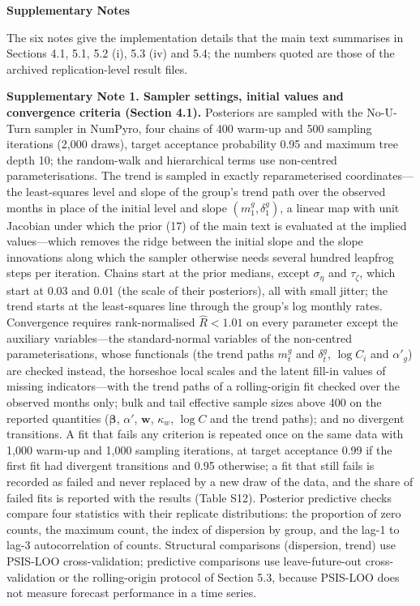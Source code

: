 \clearpage
{\large\bfseries Supplementary Notes}

The six notes give the implementation details that the main text summarises in Sections 4.1, 5.1, 5.2 (i), 5.3 (iv) and 5.4; the numbers quoted are those of the archived replication-level result files.

\textbf{Supplementary Note 1. Sampler settings, initial values and convergence criteria (Section 4.1).}
Posteriors are sampled with the No-U-Turn sampler in NumPyro, four chains of 400 warm-up and 500 sampling iterations (2,000 draws), target acceptance probability 0.95 and maximum tree depth 10; the random-walk and hierarchical terms use non-centred parameterisations. The trend is sampled in exactly reparameterised coordinates---the least-squares level and slope of the group's trend path over the observed months in place of the initial level and slope $(m_1^g, \delta_1^g)$, a linear map with unit Jacobian under which the prior (17) of the main text is evaluated at the implied values---which removes the ridge between the initial slope and the slope innovations along which the sampler otherwise needs several hundred leapfrog steps per iteration. Chains start at the prior medians, except $\sigma_\eta$ and $\tau_\zeta$, which start at 0.03 and 0.01 (the scale of their posteriors), all with small jitter; the trend starts at the least-squares line through the group's log monthly rates. Convergence requires rank-normalised $\widehat{R} < 1.01$ on every parameter except the auxiliary variables---the standard-normal variables of the non-centred parameterisations, whose functionals (the trend paths $m_t^g$ and $\delta_t^g$, $\log C_i$ and $\alpha'_g$) are checked instead, the horseshoe local scales and the latent fill-in values of missing indicators---with the trend paths of a rolling-origin fit checked over the observed months only; bulk and tail effective sample sizes above 400 on the reported quantities ($\boldsymbol{\beta}$, $\alpha'$, $\mathbf{w}$, $\kappa_w$, $\log C$ and the trend paths); and no divergent transitions. A fit that fails any criterion is repeated once on the same data with 1,000 warm-up and 1,000 sampling iterations, at target acceptance 0.99 if the first fit had divergent transitions and 0.95 otherwise; a fit that still fails is recorded as failed and never replaced by a new draw of the data, and the share of failed fits is reported with the results (Table S12). Posterior predictive checks compare four statistics with their replicate distributions: the proportion of zero counts, the maximum count, the index of dispersion by group, and the lag-1 to lag-3 autocorrelation of counts. Structural comparisons (dispersion, trend) use PSIS-LOO cross-validation; predictive comparisons use leave-future-out cross-validation or the rolling-origin protocol of Section 5.3, because PSIS-LOO does not measure forecast performance in a time series.


